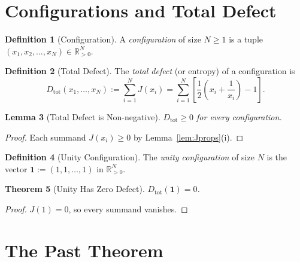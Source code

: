 \documentclass[12pt,a4paper]{article}
\newtheorem{theorem}{Theorem}[section]
\newtheorem{lemma}[theorem]{Lemma}
\theoremstyle{definition}
\newtheorem{definition}[theorem]{Definition}
\theoremstyle{remark}
\begin{document}
\section{Configurations and Total Defect}
\label{sec:config}

\begin{definition}[Configuration]
A \emph{configuration} of size $N \geq 1$ is a tuple
$(x_1, x_2, \ldots, x_N) \in \mathbb{R}_{>0}^N$.
\end{definition}

\begin{definition}[Total Defect]
The \emph{total defect} (or entropy) of a configuration is
\begin{equation}
  D_{\mathrm{tot}}(x_1, \ldots, x_N) := \sum_{i=1}^{N} J(x_i)
  = \sum_{i=1}^{N} \left[\frac{1}{2}\!\left(x_i + \frac{1}{x_i}\right)
  - 1\right].
  \label{eq:Dtot}
\end{equation}
\end{definition}

\begin{lemma}[Total Defect is Non-negative]
\label{lem:Dnonneg}
$D_{\mathrm{tot}} \geq 0$ for every configuration.
\end{lemma}

\begin{proof}
Each summand $J(x_i) \geq 0$ by Lemma~\ref{lem:Jprops}(i).
\end{proof}

\begin{definition}[Unity Configuration]
The \emph{unity configuration} of size $N$ is the vector
$\mathbf{1} := (1, 1, \ldots, 1)$ in $\mathbb{R}_{>0}^N$.
\end{definition}

\begin{theorem}[Unity Has Zero Defect]
\label{thm:unity-zero}
$D_{\mathrm{tot}}(\mathbf{1}) = 0$.
\end{theorem}

\begin{proof}
$J(1) = 0$, so every summand vanishes.
\end{proof}

\section{The Past Theorem}
\label{sec:past}
\end{document}
